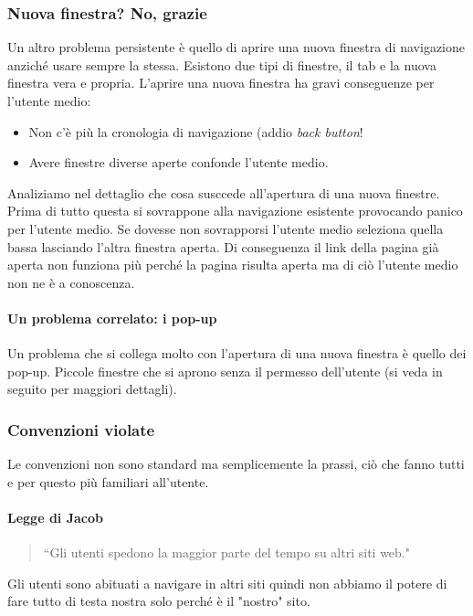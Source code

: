 		\subsubsection{Nuova finestra? No, grazie}
			Un altro problema persistente è quello di aprire una nuova finestra di navigazione anziché usare sempre la stessa.  Esistono due tipi di finestre, il tab e la nuova finestra vera e propria. L'aprire una nuova finestra ha gravi conseguenze per l'utente medio:
			\begin{itemize}
				\item Non c'è più la cronologia di navigazione (addio \emph{back button}!
				\item Avere finestre diverse aperte confonde l'utente medio.
			\end{itemize}
			Analiziamo nel dettaglio che cosa susccede all'apertura di una nuova finestre. Prima di tutto questa si sovrappone alla navigazione esistente provocando panico per l'utente medio. Se dovesse non sovrapporsi l'utente medio seleziona quella bassa lasciando l'altra finestra aperta. Di conseguenza il link della pagina già aperta non funziona più perché la pagina risulta aperta ma di ciò l'utente medio non ne è a conoscenza.
			
			\paragraph{Un problema correlato: i pop-up}
				Un problema che si collega molto con l'apertura di una nuova finestra è quello dei pop-up. Piccole finestre che si aprono senza il permesso dell'utente (si veda in seguito per maggiori dettagli).
		
		\subsubsection{Convenzioni violate}
			Le convenzioni non sono standard ma semplicemente la prassi, ciò che fanno tutti e per questo più familiari all'utente. 
			
			\paragraph{Legge di Jacob}
			\begin{quote}
				``Gli utenti spedono la maggior parte del tempo su altri siti web."
			\end{quote}
			Gli utenti sono abituati a navigare in altri siti quindi non abbiamo il potere di fare tutto di testa nostra solo perché è il "nostro" sito.
			
